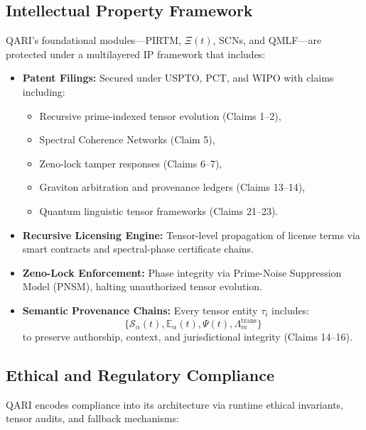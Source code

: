 \documentclass[12pt]{article}
\begin{document}
\subsection{Intellectual Property Framework}

QARI’s foundational modules—PIRTM, \( \Xi(t) \), SCNs, and QMLF—are protected under a multilayered IP framework that includes:

\begin{itemize}
    \item \textbf{Patent Filings:} Secured under USPTO, PCT, and WIPO with claims including:
    \begin{itemize}
        \item Recursive prime-indexed tensor evolution (Claims 1–2),
        \item Spectral Coherence Networks (Claim 5),
        \item Zeno-lock tamper responses (Claims 6–7),
        \item Graviton arbitration and provenance ledgers (Claims 13–14),
        \item Quantum linguistic tensor frameworks (Claims 21–23).
    \end{itemize}

    \item \textbf{Recursive Licensing Engine:} Tensor-level propagation of license terms via smart contracts and spectral-phase certificate chains.

    \item \textbf{Zeno-Lock Enforcement:} Phase integrity via Prime-Noise Suppression Model (PNSM), halting unauthorized tensor evolution.

    \item \textbf{Semantic Provenance Chains:} Every tensor entity \( \tau_i \) includes:
    \[
        \{ \mathcal{S}_\alpha(t), \mathbb{E}_\alpha(t), \Psi(t), \Lambda_m^{\text{trans}} \}
    \]
    to preserve authorship, context, and jurisdictional integrity (Claims 14–16).
\end{itemize}

\subsection{Ethical and Regulatory Compliance}

QARI encodes compliance into its architecture via runtime ethical invariants, tensor audits, and fallback mechanisms:
\end{document}
